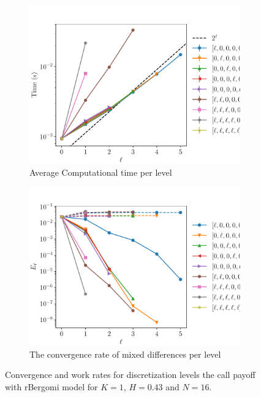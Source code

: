 \documentclass[11pt]{article}
\begin{document}
\begin{figure}[!h]
	\centering
	\begin{subfigure}{.4\textwidth}
		\centering
		\includegraphics[width=0.95\linewidth]{./figures/bergomi_misc/H_043/N_16/level_work.pdf}
		\caption{Average Computational time per level}
		\label{fig:misc_rbergomi_8_steps_sub3}
	\end{subfigure}%
	\begin{subfigure}{.4\textwidth}
		\centering
		\includegraphics[width=0.95\linewidth]{./figures/bergomi_misc/H_043/N_16/levels_error_rate.pdf}
		\caption{  The convergence rate of mixed differences per level}
		\label{fig:misc_rbergomi_8_steps_sub4}
	\end{subfigure}%
	\caption{Convergence and work rates for discretization levels  the call payoff with rBergomi model for $K=1$, $H=0.43$ and $N=16$.}
	\label{fig:misc_rbergomi_8_steps_2}
\end{figure}
\end{document}
